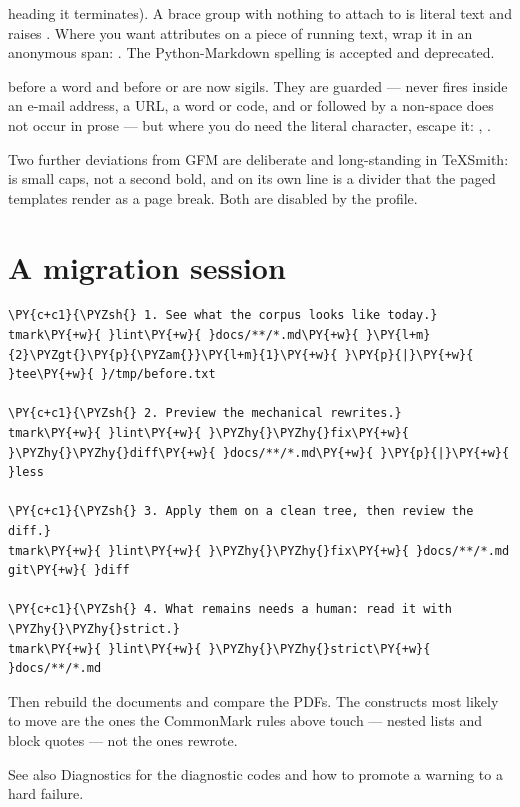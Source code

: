 \documentclass[a4paper,twoside]{article}
\begin{document}
\begin{description}
heading it terminates). A brace group with nothing to attach to is literal
text and raises . Where you want attributes on a piece
of running text, wrap it in an anonymous span: .
The Python-Markdown spelling  is accepted and deprecated.
\item[{\tscodeinline{\textbackslash{}@} and \tscodeinline{\textbackslash{}\#} escapes}]  before a word and \tscodeinline{\#} before \tscodeinline{[} or \tscodeinline{(} are now sigils. They are
guarded ---  never fires inside an e-mail address, a URL, a word or code,
and \tscodeinline{\#[} or \tscodeinline{\#(} followed by a non-space does not occur in prose --- but
where you do need the literal character, escape it: , \tscodeinline{\textbackslash{}\#}.
\end{description}
Two further deviations from GFM are deliberate and long-standing in TeXSmith:
 is small caps, not a second bold, and \tscodeinline{-\allowbreak{}-\allowbreak{}-\allowbreak{}} on its own line is a
divider that the paged templates render as a page break. Both are disabled by
the  profile.
\section{A migration session}
\begin{tscode}[lang=bash, engine=pygments]
\begin{Verbatim}[commandchars=\\\{\},breaklines, breakanywhere, commandchars=\\\{\}]
\PY{c+c1}{\PYZsh{} 1. See what the corpus looks like today.}
tmark\PY{+w}{ }lint\PY{+w}{ }docs/**/*.md\PY{+w}{ }\PY{l+m}{2}\PYZgt{}\PY{p}{\PYZam{}}\PY{l+m}{1}\PY{+w}{ }\PY{p}{|}\PY{+w}{ }tee\PY{+w}{ }/tmp/before.txt

\PY{c+c1}{\PYZsh{} 2. Preview the mechanical rewrites.}
tmark\PY{+w}{ }lint\PY{+w}{ }\PYZhy{}\PYZhy{}fix\PY{+w}{ }\PYZhy{}\PYZhy{}diff\PY{+w}{ }docs/**/*.md\PY{+w}{ }\PY{p}{|}\PY{+w}{ }less

\PY{c+c1}{\PYZsh{} 3. Apply them on a clean tree, then review the diff.}
tmark\PY{+w}{ }lint\PY{+w}{ }\PYZhy{}\PYZhy{}fix\PY{+w}{ }docs/**/*.md
git\PY{+w}{ }diff

\PY{c+c1}{\PYZsh{} 4. What remains needs a human: read it with \PYZhy{}\PYZhy{}strict.}
tmark\PY{+w}{ }lint\PY{+w}{ }\PYZhy{}\PYZhy{}strict\PY{+w}{ }docs/**/*.md
\end{Verbatim}
\end{tscode}
Then rebuild the documents and compare the PDFs. The constructs most likely to
move are the ones the CommonMark rules above touch --- nested lists and block
quotes --- not the ones  rewrote.

See also Diagnostics for the diagnostic codes and how to
promote a warning to a hard failure.
\end{document}
